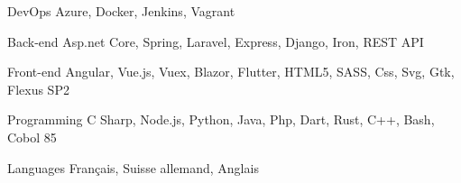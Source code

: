 

\begin{cvskills}

  \cvskill
    {DevOps} %
    {Azure, Docker, Jenkins, Vagrant} %

  \cvskill
    {Back-end} %
    {Asp.net Core, Spring, Laravel, Express, Django, Iron, REST API} %

  \cvskill
    {Front-end} %
    {Angular, Vue.js, Vuex, Blazor, Flutter, HTML5, SASS, Css, Svg, Gtk, Flexus SP2} %

  \cvskill
    {Programming} %
    {C Sharp, Node.js, Python, Java, Php, Dart, Rust, C++, Bash, Cobol 85} %

  \cvskill
    {Languages} %
    {Français, Suisse allemand, Anglais} %

\end{cvskills}
